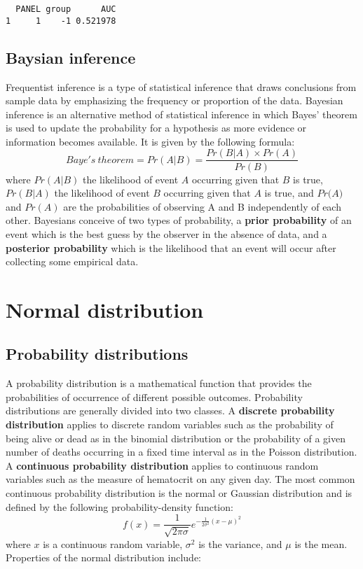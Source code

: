 \documentclass[]{book}
\theoremstyle{definition}
\theoremstyle{definition}
\theoremstyle{definition}
\theoremstyle{remark}
\begin{document}
\begin{verbatim}
  PANEL group      AUC
1     1    -1 0.521978
\end{verbatim}

\section{Baysian inference}\label{baysian-inference}

Frequentist inference is a type of statistical inference that draws
conclusions from sample data by emphasizing the frequency or proportion
of the data. Bayesian inference is an alternative method of statistical
inference in which Bayes' theorem is used to update the probability for
a hypothesis as more evidence or information becomes available. It is
given by the following formula:
\[Baye's\ theorem = {Pr({A|B})=\frac{Pr(B|A)\times Pr(A)}{Pr(B)}}\]
where \({Pr({A|B})}\) the likelihood of event \({A}\) occurring given
that \({B}\) is true, \({Pr({B|A})}\) the likelihood of event \({B}\)
occurring given that \({A}\) is true, and \({Pr({A)}}\) and \({Pr(A)}\)
are the probabilities of observing A and B independently of each other.
Bayesians conceive of two types of probability, a \textbf{prior
probability} of an event which is the best guess by the observer in the
absence of data, and a \textbf{posterior probability} which is the
likelihood that an event will occur after collecting some empirical
data.

\chapter{Normal distribution}\label{normal-distribution}

\section{Probability distributions}\label{probability-distributions}

A probability distribution is a mathematical function that provides the
probabilities of occurrence of different possible outcomes. Probability
distributions are generally divided into two classes. A \textbf{discrete
probability distribution} applies to discrete random variables such as
the probability of being alive or dead as in the binomial distribution
or the probability of a given number of deaths occurring in a fixed time
interval as in the Poisson distribution. A \textbf{continuous
probability distribution} applies to continuous random variables such as
the measure of hematocrit on any given day. The most common continuous
probability distribution is the normal or Gaussian distribution and is
defined by the following probability-density function:
\[f(x)=\frac{1}{\sqrt{2\pi\sigma}}e^{-\frac{1}{2\sigma^{2}}(x-\mu)^{2}}\]
where \({x}\) is a continuous random variable, \({\sigma^{2}}\) is the
variance, and \({\mu}\) is the mean. Properties of the normal
distribution include:
\end{document}
